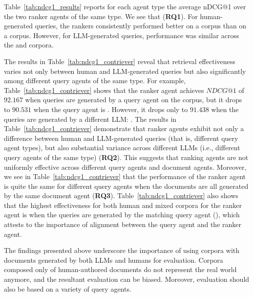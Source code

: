 



Table~\ref{tab:ndcg1_results} reports for each agent type the average nDCG@1 over the two ranker agents of the same type. 
We see that  (\textbf{RQ1}). For human-generated queries, the rankers consistently performed better on a \purehumancorpus corpus than on a \purellmcorpus corpus. However, for LLM-generated queries, performance was similar across the \purehumancorpus and \purellmcorpus corpora. 





The results in Table~\ref{tab:ndcg1_contriever} reveal that retrieval effectiveness varies not only between human and LLM-generated queries but also significantly among different query agents of the same type. 
For example, Table~\ref{tab:ndcg1_contriever} shows that the \contriever ranker agent achieves $NDCG@1$ of $92.167$ when queries are generated by a \contriever query agent on the \purehumancorpus corpus, but it drops to $90.531$ when the query agent is \llama. 
However, it drops only to $91.438$ when the queries are generated by a different LLM: \gpt. 
The results in Table~\ref{tab:ndcg1_contriever} demonstrate that ranker agents exhibit not only a difference between human and LLM-generated queries (that is, different query agent types), but also substantial variance across different LLMs (i.e., different query agents of the same type) (\textbf{RQ2}).
This suggests that ranking agents are not uniformly effective across different query agents and document agents. Moreover, we see in Table~\ref{tab:ndcg1_contriever} that the performance of the ranker agent is quite the same for different query agents when the documents are all generated by the same \llm document agent (\textbf{RQ3}).
Table~\ref{tab:ndcg1_contriever} also shows that the highest effectiveness for both human and mixed corpora for the \contriever ranker agent is when the queries are generated by the matching query agent (\contriever), which attests to the importance of alignment between the query agent and the ranker agent.

The findings presented above underscore the
importance of using corpora with documents generated by both LLMs and
humans for evaluation. Corpora composed only of human-authored
documents do not represent the real world anymore, and the resultant
evaluation can be biased. Moreover, evaluation should also be based on a variety of query agents.
